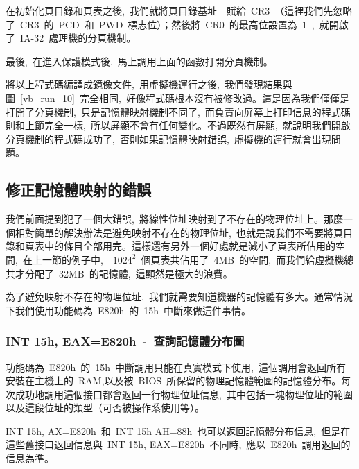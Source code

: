 在初始化頁目錄和頁表之後,~我們就將頁目錄基址~~賦給~CR3~（這裡我們先忽略了~CR3~的~PCD~和~PWD~標志位）；然後將~CR0~的最高位設置為~1~,~就開啟了~IA-32~處理機的分頁機制。

最後,~在進入保護模式後,~馬上調用上面的函數打開分頁機制。


將以上程式碼編譯成鏡像文件,~用虛擬機運行之後,~我們發現結果與圖~\ref{vb_run_10}~完全相同,~好像程式碼根本沒有被修改過。這是因為我們僅僅是打開了分頁機制,~只是記憶體映射機制不同了,~而負責向屏幕上打印信息的程式碼則和上節完全一樣,~所以屏顯不會有任何變化。不過既然有屏顯,~就說明我們開啟分頁機制的程式碼成功了,~否則如果記憶體映射錯誤,~虛擬機的運行就會出現問題。

\subsection{修正記憶體映射的錯誤}

我們前面提到犯了一個大錯誤,~將線性位址映射到了不存在的物理位址上。那麼一個相對簡單的解決辦法是避免映射不存在的物理位址,~也就是說我們不需要將頁目錄和頁表中的條目全部用完。這樣還有另外一個好處就是減小了頁表所佔用的空間,~在上一節的例子中,~~$1024^2$~個頁表共佔用了~4MB~的空間,~而我們給虛擬機總共才分配了~32MB~的記憶體,~這顯然是極大的浪費。

為了避免映射不存在的物理位址,~我們就需要知道機器的記憶體有多大。通常情況下我們使用功能碼為~E820h~的~15h~中斷來做這件事情。

\subsubsection{INT 15h, EAX=E820h~-~查詢記憶體分布圖}

功能碼為~E820h~的~15h~中斷調用只能在真實模式下使用,~這個調用會返回所有安裝在主機上的~RAM,以及被~BIOS~所保留的物理記憶體範圍的記憶體分布。每次成功地調用這個接口都會返回一行物理位址信息,~其中包括一塊物理位址的範圍以及這段位址的類型（可否被操作系使用等）。

INT 15h, AX=E820h~和~INT 15h AH=88h~也可以返回記憶體分布信息,~但是在這些舊接口返回信息與~INT 15h, EAX=E820h~不同時,~應以~E820h~調用返回的信息為準。

